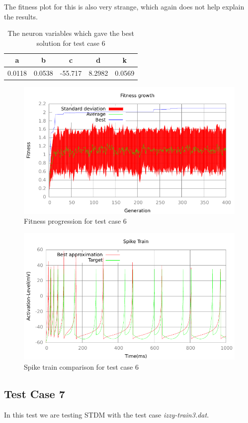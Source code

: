 The fitness plot for this is also very strange, which again does not help
explain the results.
\begin{table}
	\begin{tabular}{c c c c c}
		a & b & c & d & k \\
		\hline
		0.0118 & 0.0538 & -55.717 & 8.2982 & 0.0569
	\end{tabular}
	\caption{The neuron variables which gave the best solution for test case
	6}
\end{table}
\begin{figure}[h]
	\centering
	\includegraphics{../output/wdm_izzy_2_fitness.pdf}
	\caption{Fitness progression for test case 6}
	\label{fig:fitness-test-case-6}
\end{figure}
\begin{figure}[h]
	\centering
	\includegraphics{../output/wdm_izzy_2_spike.pdf}
	\caption{Spike train comparison for test case 6}
	\label{fig:spike-test-case-6}
\end{figure}

\subsection{Test Case 7}\label{sec:test-case-7}
In this test we are testing STDM with the test case
\textit{izzy-train3.dat}.
